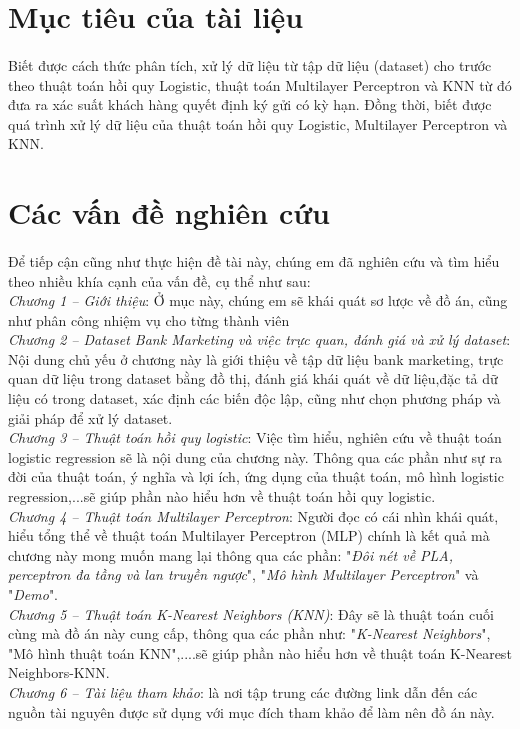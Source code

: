 \documentclass{report}
\newcommand\tab[1][1.25cm]{\hspace*{#1}}
\begin{document}
\fontsize{16}{10}\selectfont
\section{Mục tiêu của tài liệu}
    \fontsize{13}{10}\selectfont\paragraph{}
        Biết được cách thức phân tích, xử lý dữ liệu từ tập dữ liệu (dataset) cho trước theo thuật toán hồi quy Logistic, thuật toán Multilayer Perceptron và KNN từ đó đưa ra xác suất khách hàng quyết định ký gửi có kỳ hạn. Đồng thời, biết được quá trình xử lý dữ liệu của thuật toán hồi quy Logistic, Multilayer Perceptron và KNN.

\fontsize{13}{10}\selectfont
\section{Các vấn đề nghiên cứu}
    \fontsize{13}{10}\selectfont\paragraph{}
        Để tiếp cận cũng như thực hiện đề tài này, chúng em đã nghiên cứu và tìm hiểu theo nhiều khía cạnh của vấn đề, cụ thể như sau:\\\tab
        \textit{Chương 1 – Giới thiệu}: Ở mục này, chúng em sẽ khái quát sơ lược về đồ án, cũng như phân công nhiệm vụ cho từng thành viên\\\tab
        \textit{Chương 2 – Dataset Bank Marketing và việc trực quan, đánh giá và xử lý dataset}: Nội dung chủ yếu ở chương này là giới thiệu về tập dữ liệu bank marketing, trực quan dữ liệu trong dataset bằng đồ thị, đánh giá khái quát về dữ liệu,đặc tả dữ liệu có trong dataset, xác định các biến độc lập, cũng như chọn phương pháp và giải pháp để xử lý dataset.\\\tab
        \textit{Chương 3 – Thuật toán hồi quy logistic}: Việc tìm hiểu, nghiên cứu về thuật toán logistic regression sẽ là nội dung của chương này. Thông qua các phần như sự ra đời của thuật toán, ý nghĩa và lợi ích, ứng dụng của thuật toán, mô hình logistic regression,...sẽ giúp phần nào hiểu hơn về thuật toán hồi quy logistic.\\\tab
        \textit{Chương 4 – Thuật toán Multilayer Perceptron}: Người đọc có cái nhìn khái quát, hiểu tổng thể về thuật toán Multilayer Perceptron (MLP) chính là kết quả mà chương này mong muốn mang lại thông qua các phần: "\textit{Đôi nét về PLA, perceptron đa tầng và lan truyền ngược}", "\textit{Mô hình Multilayer Perceptron}" và "\textit{Demo}".\\\tab
        \textit{Chương 5 – Thuật toán K-Nearest Neighbors (KNN)}: Đây sẽ là thuật toán cuối cùng mà đồ án này cung cấp, thông qua các phần như: "\textit{K-Nearest Neighbors}", "Mô hình thuật toán KNN",....sẽ giúp phần nào hiểu hơn về thuật toán K-Nearest Neighbors-KNN.\\\tab
        \textit{Chương 6 – Tài liệu tham khảo}: là nơi tập trung các đường link dẫn đến các nguồn tài nguyên được sử dụng với mục đích tham khảo để làm nên đồ án này.
\fontsize{16}{10}\selectfont
\end{document}

